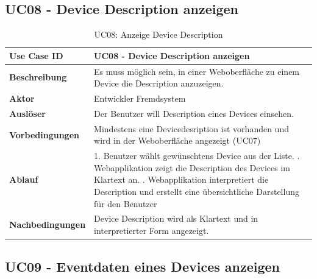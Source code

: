 \subsection{UC08 - Device Description anzeigen}
\begin{table}[H]
\begin{tabularx}{\textwidth}{|l|X|}

 \hline
 {\bf Use Case ID }    & UC08 - Device Description anzeigen \\  \hline
 {\bf Beschreibung }   & Es muss möglich sein, in einer Weboberfläche zu einem Device die Description anzuzeigen. \\ \hline
 {\bf Aktor }          & Entwickler Fremdsystem \\ \hline
 {\bf Auslöser }       & Der Benutzer will Description eines Devices einsehen. \\ \hline
 {\bf Vorbedingungen } & Mindestens eine Devicedesription ist vorhanden und wird in der Weboberfläche angezeigt (UC07) \\ \hline
 {\bf Ablauf }         & 
     1. Benutzer wählt gewünschtens Device aus der Liste. \newline
     2. Webapplikation zeigt die Description des Devices im Klartext an. \newline
     3. Webapplikation interpretiert die Description und erstellt eine übersichtliche Darstellung für den Benutzer \\ \hline
 {\bf Nachbedingungen} & Device Description wird als Klartext und in interpretierter Form angezeigt.\\ \hline
  
\end{tabularx}
\caption{UC08: Anzeige Device Description}
\end{table}

\subsection{UC09 - Eventdaten eines Devices anzeigen}

